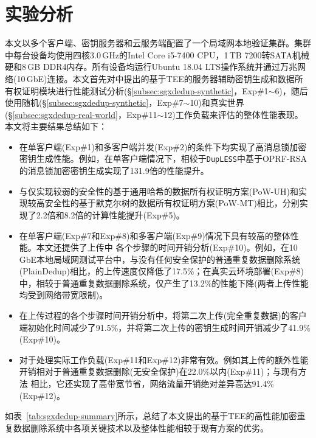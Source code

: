 \section{实验分析}
\label{sec:sgxdedup-evaluation}

本文以多个客户端、密钥服务器和云服务端配置了一个局域网本地验证集群。集群中每台设备均使用四核3.0\,GHz的Intel Core i5-7400 CPU，1\,TB 7200转SATA机械硬和8\,GB DDR4内存。所有设备均运行Ubuntu 18.04 LTS操作系统并通过万兆网络(10\,GbE)连接。本文首先对\sysnameS 中提出的基于TEE的服务器辅助密钥生成和数据所有权证明模块进行性能测试分析(\S\ref{subsec:sgxdedup-synthetic}，Exp\#1$\sim$6)，随后使用随机(\S\ref{subsec:sgxdedup-synthetic}，Exp\#7$\sim$10)和真实世界(\S\ref{subsec:sgxdedup-real-world}，Exp\#11$\sim$12)工作负载来评估\sysnameS 的整体性能表现。本文将主要结果总结如下：

\begin{itemize}
    \item \sysnameS 在单客户端(Exp\#1)和多客户端并发(Exp\#2)的条件下均实现了高消息锁加密密钥生成性能。例如，在单客户端情况下，相较于{\tt DupLESS}\cite{bellare2013DupLESS}中基于OPRF-RSA的消息锁加密密钥生成实现了131.9倍的性能提升。
    \item \sysnameS 与仅实现较弱的安全性的基于通用哈希的数据所有权证明方案(PoW-UH)\cite{xu2013weak}和实现较高安全性的基于默克尔树的数据所有权证明方案(PoW-MT)\cite{halevi11}相比，分别实现了2.2倍和8.2倍的计算性能提升(Exp\#5)。
    \item \sysnameS 在单客户端(Exp\#7和Exp\#8)和多客户端(Exp\#9)情况下具有较高的整体性能。本文还提供了上传中 \sysnameS 各个步骤的时间开销分析(Exp\#10)。例如，在10\,GbE本地局域网测试平台中，与没有任何安全保护的普通重复数据删除系统(PlainDedup)相比，\sysnameS 的上传速度仅降低了17.5\%；在真实云环境部署(Exp\#8)中，相较于普通重复数据删除系统，\sysnameS 仅产生了13.2\%的性能下降(两者上传性能均受到网络带宽限制)。
    \item 在上传过程的各个步骤时间开销分析中，\sysnameS 将第二次上传(完全重复数据)的客户端初始化时间减少了91.5\%，并将第二次上传的密钥生成时间开销减少了41.9\%(Exp\#10)。
    \item \sysnameS 对于处理实际工作负载(Exp\#11和Exp\#12)非常有效。例如其上传的额外性能开销相对于普通重复数据删除(无安全保护)在22.0\%以内(Exp\#11)；与现有方法\cite{li15,harnik2010side} 相比，它还实现了高带宽节省，网络流量开销绝对差异高达91.4\%(Exp\#12)。
\end{itemize}

如表~\ref{tab:sgxdedup-summary}所示，总结了本文提出的基于TEE的高性能加密重复数据删除系统\sysnameS 中各项关键技术以及整体性能相较于现有方案的优劣。

